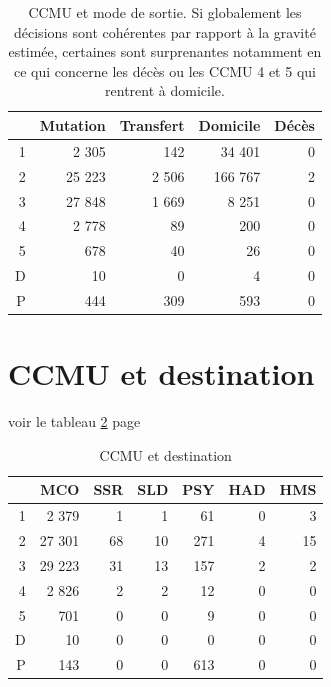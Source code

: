 \documentclass[12pt,english,french,twoside]{book}\usepackage[]{graphicx}\usepackage[]{color}
\begin{document}
\begin{table}[ht]
\centering
\begin{tabular}{rrrrr}
  \hline
 & Mutation & Transfert & Domicile & Décès \\ 
  \hline
1 & 2 305 & 142 & 34 401 & 0 \\ 
  2 & 25 223 & 2 506 & 166 767 & 2 \\ 
  3 & 27 848 & 1 669 & 8 251 & 0 \\ 
  4 & 2 778 & 89 & 200 & 0 \\ 
  5 & 678 & 40 & 26 & 0 \\ 
  D & 10 & 0 & 4 & 0 \\ 
  P & 444 & 309 & 593 & 0 \\ 
   \hline
\end{tabular}
\caption[CCMU et mode de sortie]{CCMU et mode de sortie. Si globalement les décisions sont cohérentes par rapport à la gravité estimée, certaines sont surprenantes notamment en ce qui concerne les décès ou les CCMU 4 et 5 qui rentrent à domicile.} 
\label{tab:ccmu_mode_sortie}
\end{table}


\section{CCMU et destination}

voir le tableau \ref{tab:ccmu_dest} page \pageref{tab:ccmu_dest}

\begin{table}[ht]
\centering
\begin{tabular}{rrrrrrr}
  \hline
 & MCO & SSR & SLD & PSY & HAD & HMS \\ 
  \hline
1 & 2 379 & 1 & 1 & 61 & 0 & 3 \\ 
  2 & 27 301 & 68 & 10 & 271 & 4 & 15 \\ 
  3 & 29 223 & 31 & 13 & 157 & 2 & 2 \\ 
  4 & 2 826 & 2 & 2 & 12 & 0 & 0 \\ 
  5 & 701 & 0 & 0 & 9 & 0 & 0 \\ 
  D & 10 & 0 & 0 & 0 & 0 & 0 \\ 
  P & 143 & 0 & 0 & 613 & 0 & 0 \\ 
   \hline
\end{tabular}
\caption[CCMU et destination]{CCMU et destination} 
\label{tab:ccmu_dest}
\end{table}
\end{document}
